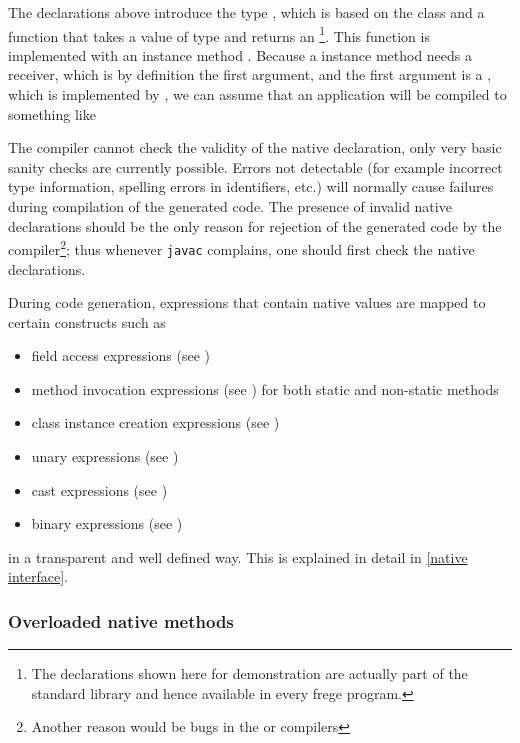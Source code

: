 The declarations above introduce the type , which is based on the \java{} class  and a function  that takes a value of type  and returns an 
\footnote{The declarations shown here for demonstration are actually part of the standard library and hence available in every frege program.}. 
This function is implemented with an instance method . Because a \java{} instance method needs a receiver, which is by definition the first argument, and the first argument is a , which is implemented by  , we can assume that an application  will be compiled to something like 

The \frege{} compiler cannot check the validity of the native declaration, only very basic sanity checks are currently possible.
 Errors not detectable (for example incorrect type information, spelling errors in identifiers, etc.) will normally cause failures during compilation of the generated \java{} code. 
The presence of invalid native declarations should be the only reason for rejection of the generated code by the \java{} compiler\footnote{Another reason would be bugs in the \java{} or \frege{} compilers}; thus whenever \texttt{javac} complains, one should first check the native declarations.

During code generation, expressions that contain native values  are mapped to certain \java{} constructs such as

\begin{itemize}
\item field access expressions (see \cite[section 15.11]{langspec3})
\item method invocation expressions (see \cite[section 15.12]{langspec3}) for both static and non-static methods
\item class instance creation expressions (see \cite[section 15.9]{langspec3})
\item unary expressions (see \cite[section 15.15]{langspec3})
\item cast expressions (see \cite[section 15.16]{langspec3})
\item binary expressions (see \cite[section 15.17 to 15.24]{langspec3})
\end{itemize}

in a transparent and well defined way. This is explained in detail in \autoref{native interface}.

\subsubsection{Overloaded native methods} 

